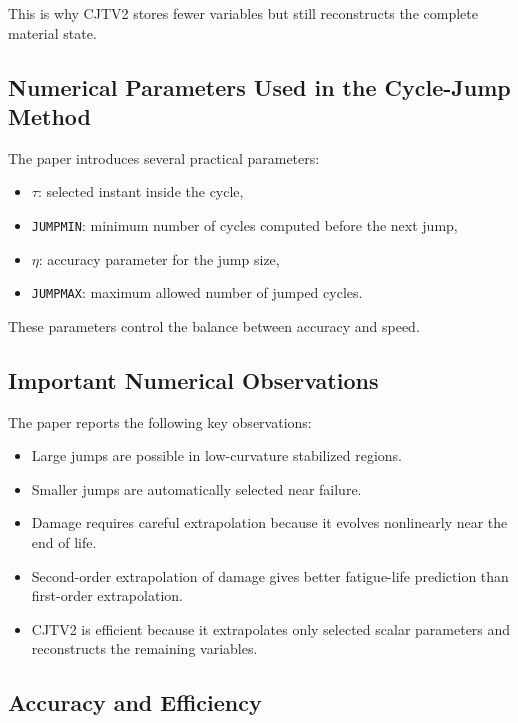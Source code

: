 ﻿\documentclass[11pt,a4paper]{article}
\begin{document}
This is why CJTV2 stores fewer variables but still reconstructs the complete material state.

\subsection{Numerical Parameters Used in the Cycle-Jump Method}

The paper introduces several practical parameters:

\begin{itemize}[leftmargin=*]
    \item $\tau$: selected instant inside the cycle,
    \item \texttt{JUMPMIN}: minimum number of cycles computed before the next jump,
    \item $\eta$: accuracy parameter for the jump size,
    \item \texttt{JUMPMAX}: maximum allowed number of jumped cycles.
\end{itemize}

These parameters control the balance between accuracy and speed.

\subsection{Important Numerical Observations}

The paper reports the following key observations:

\begin{itemize}[leftmargin=*]
    \item Large jumps are possible in low-curvature stabilized regions.
    \item Smaller jumps are automatically selected near failure.
    \item Damage requires careful extrapolation because it evolves nonlinearly near the end of life.
    \item Second-order extrapolation of damage gives better fatigue-life prediction than first-order extrapolation.
    \item CJTV2 is efficient because it extrapolates only selected scalar parameters and reconstructs the remaining variables.
\end{itemize}

\subsection{Accuracy and Efficiency}
\end{document}
